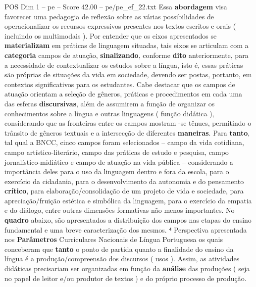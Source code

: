 \begin{textsample}{POS Dim 1 – pe – Score 42.00 – pe/pe\_ef\_22.txt}
Essa \textbf{abordagem} visa favorecer uma pedagogia de reflexão sobre as várias possibilidades de operacionalizar os recursos expressivos presentes nos textos escritos e orais ( incluindo os multimodais ).
Por entender que os eixos apresentados se \textbf{materializam} em práticas de linguagem situadas, tais eixos se articulam com a \textbf{categoria} campos de atuação, \textbf{sinalizando}, conforme \textbf{dito} anteriormente, para a necessidade de contextualizar os estudos sobre a língua, isto é, essas práticas são próprias de situações da vida em sociedade, devendo ser postas, portanto, em contextos significativos para os estudantes.
Cabe destacar que os campos de atuação orientam a seleção de gêneros, práticas e procedimentos em cada uma das esferas \textbf{discursivas}, além de assumirem a função de organizar os conhecimentos sobre a língua e outras linguagens ( função didática ), considerando que as fronteiras entre os campos mostram -se tênues, permitindo o trânsito de gêneros textuais e a intersecção de diferentes \textbf{maneiras}.
Para \textbf{tanto}, tal qual a BNCC, cinco campos foram selecionados – campo da vida cotidiana, campo artístico-literário, campo das práticas de estudo e pesquisa, campo jornalístico-midiático e campo de atuação na vida pública – considerando a importância deles para o uso da linguagem dentro e fora da escola, para o exercício da cidadania, para o desenvolvimento da autonomia e do pensamento \textbf{crítico}, para elaboração/consolidação de um projeto de vida e sociedade, para apreciação/fruição estética e simbólica da linguagem, para o exercício da empatia e do diálogo, entre outras dimensões formativas não menos importantes.
No \textbf{quadro} abaixo, são apresentados a distribuição dos campos nas etapas do ensino fundamental e uma breve caracterização dos mesmos. ⁴ Perspectiva apresentada nos \textbf{Parâmetros} Curriculares Nacionais de Língua Portuguesa os quais conceberam que \textbf{tanto} o ponto de partida quanto a finalidade do ensino da língua é a produção/compreensão dos discursos ( usos ).
Assim, as atividades didáticas precisariam ser organizadas em função da \textbf{análise} das produções ( seja no papel de leitor e/ou produtor de textos ) e do próprio processo de produção.

\end{textsample}
